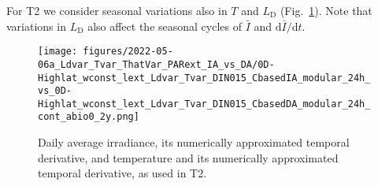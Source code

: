 \documentclass[gmd, manuscript]{copernicus}
\newcommand{\onur}[1]{\textcolor{blue}{\{Onur: #1\}}}
\begin{document}
For T2 we consider seasonal variations also in $T$ and $L_{\text{D}}$ (Fig.~\ref{f.T2env}).  Note that variations in $L_{\text{D}}$ also affect the seasonal cycles of $\bar{I}$ and $\text{d}\bar{I}/\text{d}t$.

\begin{figure}[ht!]
  \texttt{[image: figures/2022-05-06a\_Ldvar\_Tvar\_ThatVar\_PARext\_IA\_vs\_DA/0D-Highlat\_wconst\_lext\_Ldvar\_Tvar\_DIN015\_CbasedIA\_modular\_24h\_vs\_0D-Highlat\_wconst\_lext\_Ldvar\_Tvar\_DIN015\_CbasedDA\_modular\_24h\_cont\_abio0\_2y.png]}
  \caption{Daily average irradiance, its numerically approximated temporal derivative, and temperature and its numerically approximated temporal derivative, as used in T2.\label{f.T2env}}
\end{figure}


%
\end{document}
